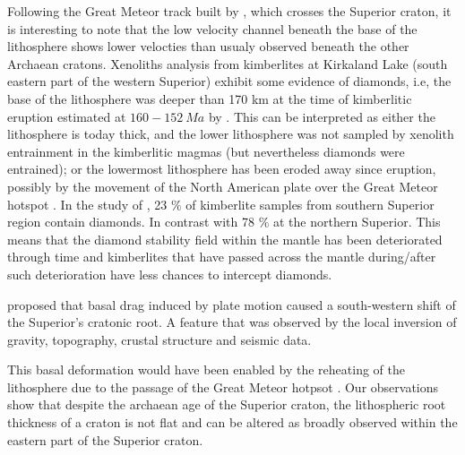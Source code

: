 \documentclass[12pt]{article}
\begin{document}
			Following the Great Meteor track built by \cite{heaman2000timing}, which crosses the Superior craton, it is interesting to note that the low velocity channel beneath the base of the lithosphere shows lower velocties than usualy observed beneath the other Archaean cratons. 
			Xenoliths analysis from kimberlites at Kirkaland Lake (south eastern part of the western Superior) exhibit some evidence of diamonds, i.e, the base of the lithosphere was deeper than 170 km at the time of kimberlitic eruption \citep{jones2014electrical} estimated at $160 - 152 \: Ma$ by \cite{heaman2000timing,heaman2003timing}. 
			This can be interpreted as either the lithosphere is today thick, and the lower lithosphere was not sampled by xenolith entrainment in the kimberlitic magmas (but nevertheless diamonds were entrained); or the lowermost lithosphere has been eroded away since eruption, possibly by the movement of the North American plate over the Great Meteor hotspot \citep{heaman2000timing,jones2014electrical}. In the study of \cite{faure2011seismic}, 23 $\%$ of kimberlite samples from southern Superior region contain diamonds. In contrast with 78 $\%$ at the northern Superior. This means that the diamond stability field within the mantle has been deteriorated through time and kimberlites that have passed across the mantle during/after such deterioration have less chances to intercept diamonds. \citep{faure2011seismic}

			\cite{kaban2015cratonic} proposed that basal drag induced by plate motion caused a south-western shift of the Superior's cratonic root. A feature that was observed by the local inversion of gravity, topography, crustal structure and seismic data.

			This basal deformation would have been enabled by the reheating of the lithosphere due to the passage of the Great Meteor hotpsot \citep[see][]{eaton2007seismic,kaban2015cratonic}.
			Our observations show that despite the archaean age of the Superior craton, the lithospheric root thickness of a craton is not flat and can be altered as broadly observed within the eastern part of the Superior craton.
\end{document}
